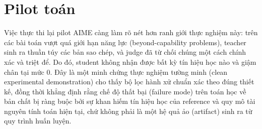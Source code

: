 \section{Pilot toán}\label{math-pilot}

Việc thực thi lại pilot AIME càng làm rõ nét hơn ranh giới thực nghiệm này: trên các bài toán vượt quá giới hạn năng lực (beyond-capability problems), teacher sinh ra thuần túy các bản sao chép, và judge đã từ chối chúng một cách chính xác và triệt để. Do đó, student không nhận được bất kỳ tín hiệu học nào và giậm chân tại mức 0. Đây là một minh chứng thực nghiệm tường minh (clean experimental demonstration) cho thấy bộ lọc hành xử chuẩn xác theo đúng thiết kế, đồng thời khẳng định rằng chế độ thất bại (failure mode) trên toán học về bản chất bị ràng buộc bởi sự khan hiếm tín hiệu học của reference và quy mô tài nguyên tính toán hiện tại, chứ không phải là một hệ quả ảo (artifact) sinh ra từ quy trình huấn luyện.
